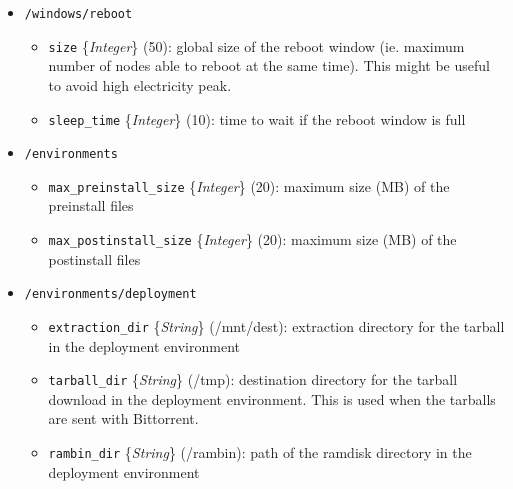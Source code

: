 \documentclass[a4wide,10pt,oneside]{book}
\newcommand{\ypath}[1]{\texttt{#1}}
\newcommand{\yfieldd}[3]{\texttt{#1} {\small\{{\emph{#2}}\}} {\small(}#3{\small)}:}
\begin{document}
\begin{itemize}
  \item \ypath{/windows/reboot}
  \begin{itemize}
    \item \yfieldd{size}{Integer}{50} global size of the reboot window (ie. maximum number of nodes able to reboot at the same time). This might be useful to avoid high electricity peak.
    \item \yfieldd{sleep\_time}{Integer}{10} time to wait if the reboot window is full
  \end{itemize}

  \item \ypath{/environments}
  \begin{itemize}
    \item \yfieldd{max\_preinstall\_size}{Integer}{20} maximum size (MB) of the preinstall files
    \item \yfieldd{max\_postinstall\_size}{Integer}{20} maximum size (MB) of the postinstall files
  \end{itemize}

  \item \ypath{/environments/deployment}
  \begin{itemize}
    \item \yfieldd{extraction\_dir}{String}{/mnt/dest} extraction directory for the tarball in the deployment environment
    \item \yfieldd{tarball\_dir}{String}{/tmp} destination directory for the tarball download in the deployment environment. This is used when the tarballs are sent with Bittorrent.
    \item \yfieldd{rambin\_dir}{String}{/rambin} path of the ramdisk directory in the deployment environment
  \end{itemize}


\end{itemize}
\end{document}
